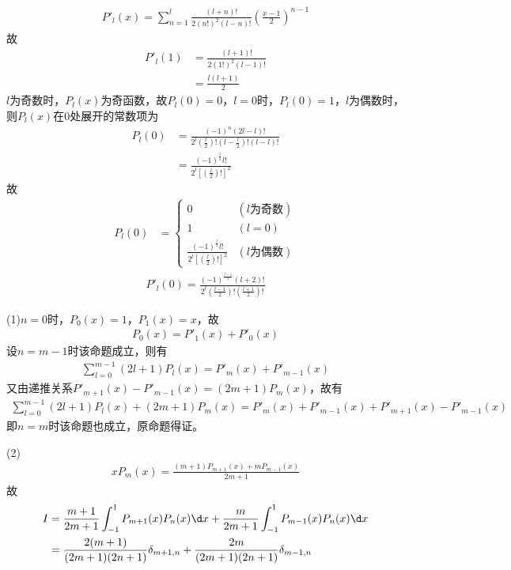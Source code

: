\documentclass{phyasgn}
\begin{document}
\begin{sol}[1]
    \begin{align*}
      P'_l(x)=\sum_{n=1}^{l}\frac{(l+n)!}{2(n!)^2(l-n)!}\left(\frac{x-1}{2}\right)^{n-1}
    \end{align*}
    故
    \begin{align*}
      P'_l(1)&=\frac{(l+1)!}{2(1!)^2(l-1)!}\\
      &=\frac{l(l+1)}{2}
    \end{align*}
    $l$为奇数时，$P_l(x)$为奇函数，故$P_l(0)=0$，$l=0$时，$P_l(0)=1$，$l$为偶数时，则$P_l(x)$在$0$处展开的常数项为
    \begin{align*}
      P_l(0)&=\frac{(-1)^n(2l-l)!}{2^l(\frac{l}{2})!(l-\frac{l}{2})!(l-l)!}\\
      &=\frac{(-1)^{\frac{l}{2}}l!}{2^l[(\frac{l}{2})!]^2}
    \end{align*}
    故
    \begin{align*}
      P_l(0)&=\left\{\begin{matrix}
        0&(l\text{为奇数})\\
        1&(l=0)\\
        \frac{(-1)^{\frac{l}{2}}l!}{2^l[(\frac{l}{2})!]^2}&(l\text{为偶数})
      \end{matrix}\right.
    \end{align*}
    \begin{align*}
      P'_l(0)=\frac{(-1)^{\frac{l-1}{2}}(l+2)!}{2^l(\frac{l-1}{2})!(\frac{l+1}{2})!}
    \end{align*}
\end{sol}\par

\begin{sol}[2]
  (1)$n=0$时，$P_0(x)=1$，$P_1(x)=x$，故
  \begin{align*}
    P_0(x)=P'_1(x)+P'_0(x)
  \end{align*}
 设$n=m-1$时该命题成立，则有
 \begin{align*}
  \sum_{l=0}^{m-1}(2l+1)P_l(x)=P'_m(x)+P'_{m-1}(x)
 \end{align*}
 又由递推关系$P'_{m+1}(x)-P'_{m-1}(x)=(2m+1)P_m(x)$，故有
 \begin{align*}
  \sum_{l=0}^{m-1}(2l+1)P_l(x)+(2m+1)P_m(x)=P'_m(x)+P'_{m-1}(x)+P'_{m+1}(x)-P'_{m-1}(x)
 \end{align*}
 即$n=m$时该命题也成立，原命题得证。

 (2)\begin{align*}
  xP_m(x)=\frac{(m+1)P_{m+1}(x)+mP_{m-1}(x)}{2m+1}
 \end{align*}
 故
 \begin{align*}
  I&=\frac{m+1}{2m+1}\int_{-1}^{1}P_{m+1}(x)P_{n}(x)\d x+\frac{m}{2m+1}\int_{-1}^{1}P_{m-1}(x)P_{n}(x)\d x\\
  &=\frac{2(m+1)}{(2m+1)(2n+1)}\delta_{m+1,n}+\frac{2m}{(2m+1)(2n+1)}\delta_{m-1,n}
 \end{align*}
\end{sol}\par
\end{document}
